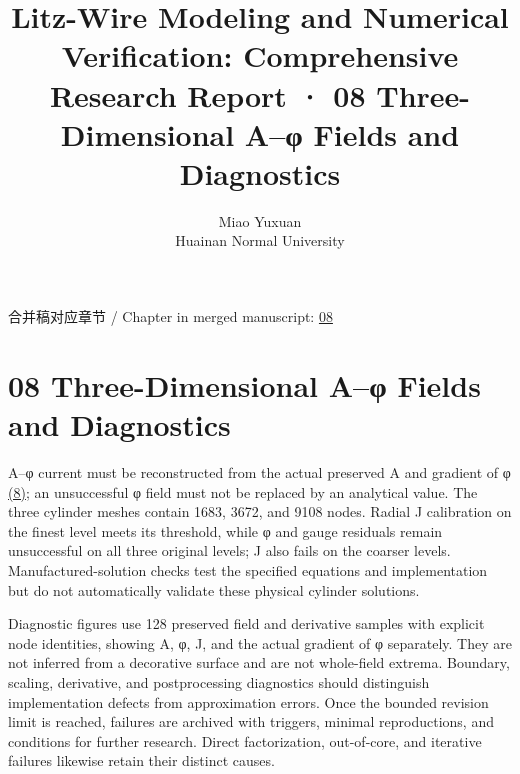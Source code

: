 \documentclass[11pt]{article}
\begin{document}
\title{Litz-Wire Modeling and Numerical Verification: Comprehensive Research Report · 08 Three-Dimensional A–φ Fields and Diagnostics}
\author{Miao Yuxuan\\Huainan Normal University}
\date{}
\maketitle
\noindent 合并稿对应章节 / Chapter in merged manuscript: \href{report_en_single.pdf#chapter-08}{08}\par
\FloatBarrier
\section*{08 Three-Dimensional A–φ Fields and Diagnostics}
\hypertarget{chapter-08}{}
A–φ current must be reconstructed from the actual preserved A and gradient of φ \href{report_en_single.pdf#E07}{(8)}; an unsuccessful φ field must not be replaced by an analytical value. The three cylinder meshes contain 1683, 3672, and 9108 nodes. Radial J calibration on the finest level meets its threshold, while φ and gauge residuals remain unsuccessful on all three original levels; J also fails on the coarser levels. Manufactured-solution checks test the specified equations and implementation but do not automatically validate these physical cylinder solutions.


Diagnostic figures use 128 preserved field and derivative samples with explicit node identities, showing A, φ, J, and the actual gradient of φ separately. They are not inferred from a decorative surface and are not whole-field extrema. Boundary, scaling, derivative, and postprocessing diagnostics should distinguish implementation defects from approximation errors. Once the bounded revision limit is reached, failures are archived with triggers, minimal reproductions, and conditions for further research. Direct factorization, out-of-core, and iterative failures likewise retain their distinct causes.
\end{document}
